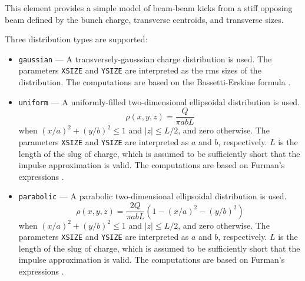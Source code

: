 This element provides a simple model of beam-beam kicks from a stiff opposing beam
defined by the bunch charge, transverse centroids, and transverse sizes.

Three distribution types are supported:
\begin{itemize}
\item \verb|gaussian| --- A transversely-gausssian charge distribution is used.
  The parameters \verb|XSIZE| and \verb|YSIZE| are interpreted as
  the rms sizes of the distribution. 
The computations are based on the Bassetti-Erskine formula \cite{BassettiErskine}.
\item \verb|uniform| --- A uniformly-filled two-dimensional ellipsoidal distribution is used.
\begin{equation}
  \rho(x,y, z) = \frac{Q}{\pi a b L}
\end{equation}
 when
$(x/a)^2 + (y/b)^2\leq 1$ and $\left|z\right|\leq L/2$, and zero otherwise.
The parameters \verb|XSIZE| and \verb|YSIZE| are interpreted as $a$ and $b$, respectively.
$L$ is the length of the slug of charge, which is assumed to be sufficiently short that
the impulse approximation is valid.
The computations are based on Furman's expressions \cite{Furman-LBL-34682}.
\item \verb|parabolic| --- A parabolic two-dimensional ellipsoidal distribution is used.
\begin{equation}
  \rho(x,y,z) = \frac{2 Q}{\pi a b L} (1 - (x/a)^2 - (y/b)^2)
\end{equation}
 when
$(x/a)^2 + (y/b)^2\leq 1$ and $\left|z\right|\leq L/2$, and zero otherwise.
The parameters \verb|XSIZE| and \verb|YSIZE| are interpreted as $a$ and $b$, respectively.
$L$ is the length of the slug of charge, which is assumed to be sufficiently short that
the impulse approximation is valid.
The computations are based on Furman's expressions \cite{Furman-LBL-34682}.
\end{itemize}
